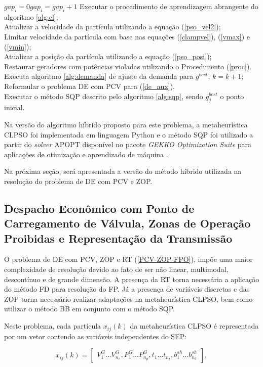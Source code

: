 \documentclass[
	12pt,				%
	openany,			%
	twoside,			%
	a4paper,			%
	chapter=TITLE,		%
	section=Title,		%
	subsection=Title,	%
	subsubsection=Title,%
	english,			%
	french,				%
	spanish,			%
	brazil			%
	]{abntex2}
\begin{document}
\begin{ERRATA}
\begin{algorithm}[hbt!]
{{{
{$gap_i=0$}{$gap_i=gap_i+1$}
Executar o procedimento de aprendizagem abrangente do algoritmo \ref{alg:cl};\\
Atualizar a velocidade da partícula utilizando a equação (\ref{pso_vel2});\\
Limitar velocidade da partícula com base nas equações (\ref{clampvel}), (\ref{vmax}) e (\ref{vmin});\\
Atualizar a posição da partícula utilizando a equação (\ref{pso_posi});\\
Restaurar geradores com potências violadas utilizando o Procedimento (\ref{proc}).\\
Executa algoritmo \ref{alg:demanda} de ajuste da demanda para $g^{best}$;
}
$k=k+1$;
}
Reformular o problema DE com PCV para (\ref{de_aux}).\\ 
Executar o método SQP descrito pelo algoritmo \ref{alg:sqp}, sendo  $g^{best}_j$ o ponto inicial.
}

\end{algorithm}

Na versão do algoritmo híbrido proposto para este problema, a metaheurística CLPSO foi implementada em linguagem Python e o método SQP foi utilizado a partir do \emph{solver} APOPT disponível no pacote \emph{GEKKO Optimization Suite} para aplicações de otimização e aprendizado de máquina \cite{apopt}.

Na próxima seção, será apresentada a versão do método híbrido utilizada na resolução do problema de DE com PCV e ZOP.

\subsection{Despacho Econômico com Ponto de Carregamento de Válvula, Zonas de Operação Proibidas e Representação da Transmissão}

O problema de DE com PCV, ZOP e RT (\ref{PCV-ZOP-FPO}), impõe uma maior complexidade de resolução devido ao fato de ser não linear, multimodal, descontínuo e de grande dimensão. A presença da RT torna necessária a aplicação do método FD para resolução do FP. Já a presença de variáveis discretas e das ZOP torna necessário realizar adaptações na metaheurística CLPSO, bem como utilizar o método BB em conjunto com o método SQP.

Neste problema, cada partícula $x_{ij}(k)$ da metaheurística CLPSO é representada por um vetor contendo as variáveis independentes do SEP:


\begin{equation}
x_{ij}(k) = \begin{bmatrix}
V^G_1 . . . V^G_{n_v}, P^G_1 . . . P^G_{n_p}, t_1 . . . t_{n_t}, b^{sh}_1 . . . b^{sh}_{n_b}
\end{bmatrix},
\end{equation}


\end{ERRATA}
\end{document}
